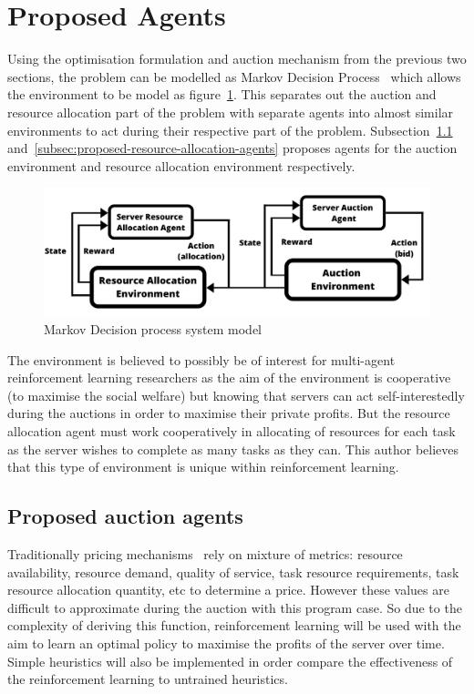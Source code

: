 \section{Proposed Agents}\label{sec:proposed-agents}
Using the optimisation formulation and auction mechanism from the previous two sections, the problem can be modelled as
Markov Decision Process~\citep{Bel} which allows the environment to be model as figure~\ref{fig:mdp_system_model}.
This separates out the auction and resource allocation part of the problem with
separate agents into almost similar environments to act during their respective part of the problem.
Subsection~\ref{subsec:proposed-auction-agents} and~\ref{subsec:proposed-resource-allocation-agents} proposes agents
for the auction environment and resource allocation environment respectively.

\begin{figure}
    \centering
    \includegraphics[width=14cm]{figures/solution_fig/flexible_resource_allocation_env.pdf}
    \caption{Markov Decision process system model}
    \label{fig:mdp_system_model}
\end{figure}

The environment is believed to possibly be of interest for multi-agent reinforcement learning researchers as the aim
of the environment is cooperative (to maximise the social welfare) but knowing that servers can act self-interestedly
during the auctions in order to maximise their private profits. But the resource allocation agent must work
cooperatively in allocating of resources for each task as the server wishes to complete as many tasks as they can.
This author believes that this type of environment is unique within reinforcement learning.

\subsection{Proposed auction agents}\label{subsec:proposed-auction-agents}
Traditionally pricing mechanisms~\citep{al2013cloud} rely on mixture of metrics: resource availability, resource demand,
quality of service, task resource requirements, task resource allocation quantity, etc to determine a price. However
these values are difficult to approximate during the auction with this program case. So due to the complexity of
deriving this function, reinforcement learning will be used with the aim to learn an optimal policy to maximise the
profits of the server over time. Simple heuristics will also be implemented in order compare the effectiveness of the
reinforcement learning to untrained heuristics.

